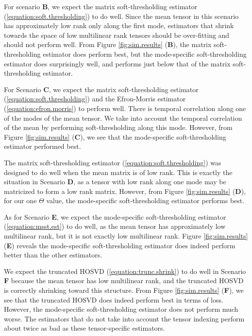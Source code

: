 For scenario \textbf{B}, we expect the matrix soft-thresholding
estimator (\ref{equation:soft.thresholding}) to do well. Since the
mean tensor in this scenario has approximately low rank only along the
first mode, estimators that shrink towards the space of low
multilinear rank tensors should be over-fitting and should not perform
well. From Figure \ref{fig:sim.results} (\textbf{B}), the matrix
soft-thresholding estimator does perform best, but the mode-specific
soft-thresholding estimator does surprisingly well, and performs just
below that of the matrix soft-thresholding estimator.

For Scenario \textbf{C}, we expect the matrix soft-thresholding
estimator (\ref{equation:soft.thresholding}) and the Efron-Morris
estimator (\ref{equation:efron.morris}) to perform well. There is
temporal correlation along one of the modes of the mean tensor. We
take into account the temporal correlation of the mean by performing
soft-thresholding along this mode. However, from Figure
\ref{fig:sim.results} (\textbf{C}), we see that the mode-specific
soft-thresholding estimator performed best.

The matrix soft-thresholding estimator
(\ref{equation:soft.thresholding}) was designed to do well when the
mean matrix is of low rank. This is exactly the situation in Scenario
\textbf{D}, as a tensor with low rank along one mode may be matricized
to form a low rank matrix. However, from Figure \ref{fig:sim.results}
(\textbf{D}), for our one $\Theta$ value, the mode-specific
soft-thresholding estimator performs best.

As for Scenario \textbf{E}, we expect the mode-specific
soft-thresholding estimator (\ref{equation:msst.est}) to do well, as
the mean tensor has approximately low multilinear rank, but it is not
exactly low multilinear rank. Figure \ref{fig:sim.results}
(\textbf{E}) reveals the mode-specific soft-thresholding estimator
does indeed perform better than the other estimators.

We expect the truncated HOSVD (\ref{equation:trunc.shrink}) to do well
in Scenario \textbf{F} because the mean tensor has low multilinear
rank, and the truncated HOSVD is correctly shrinking toward this
structure. From Figure \ref{fig:sim.results} (\textbf{F}), we see that
the truncated HOSVD does indeed perform best in terms of
loss. However, the mode-specific soft-thresholding estimator does not
perform much worse. The estimators that do not take into account the
tensor indexing perform about twice as bad as these tensor-specific
estimators.

